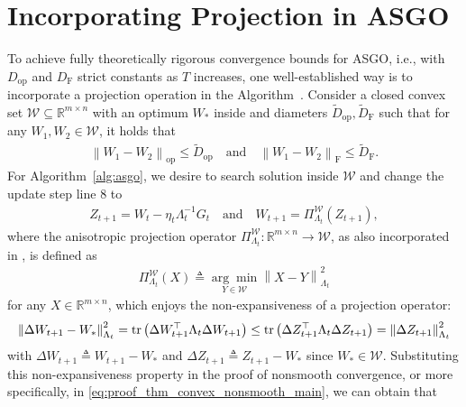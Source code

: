 \documentclass{article}
\theoremstyle{remark}
\newcommand{\Norm}[1]{\left\|#1\right\|}
\newcommand{\tr}[1]{{\rm tr}\left( #1 \right)}
\newcommand{\cW}{\mathcal{W}}
\newcommand{\RR}{\mathbb{R}}
\begin{document}
\section{Incorporating Projection in ASGO}\label{appendix:projection_operation}
To achieve fully theoretically rigorous convergence bounds for ASGO, i.e., with $D_{\mathrm{op}}$ and $D_{\mathrm{F}}$ strict constants as $T$ increases, one well-established way is to incorporate a projection operation in the Algorithm~\citep{hazan2007logarithmic,duchi2011adaptive}. Consider a closed convex set $\cW \subseteq \RR^{m\times n}$ with an optimum $W_*$ inside and diameters $\tilde{D}_{\mathrm{op}}, \tilde{D}_{\mathrm{F}}$ such that for any $W_1, W_2 \in \cW$, it holds that
\begin{align*}
    \Norm{W_1 - W_2}_{\mathrm{op}} \le \tilde{D}_{\mathrm{op}} \quad \text{and} \quad \Norm{W_1 - W_2}_{\mathrm{F}} \le \tilde{D}_{\mathrm{F}} .
\end{align*}
For Algorithm~\ref{alg:asgo}, we desire to search solution inside $\cW$ and change the update step line 8 to
\begin{align*}
    Z_{t+1} = W_t - \eta_t \Lambda_t^{-1} G_t \quad \text{and} \quad 
    W_{t+1} = \Pi_{\Lambda_t}^{\cW}\left( Z_{t+1} \right) ,
\end{align*}
where the anisotropic projection operator $\Pi_{\Lambda_t}^{\cW}: \RR^{m\times n} \to \cW$, as also incorporated in \citet{hazan2007logarithmic,duchi2011adaptive}, is defined as
\begin{align*}
    \Pi_{\Lambda_t}^{\cW}\left( X \right) \triangleq \underset{Y \in \cW}{\arg \min} \Norm{X - Y}_{\Lambda_t}^2
\end{align*}
for any $X \in \RR^{m\times n}$, which enjoys the non-expansiveness of a projection operator:
\begin{align}\label{eq:non-expansiveness-projection}
    \Norm{\Delta W_{t+1} - W_*}_{\Lambda_t}^2 = \tr{\Delta W_{t+1}^\top \Lambda_t \Delta W_{t+1}} \le \tr{\Delta Z_{t+1}^\top \Lambda_t \Delta Z_{t+1}} = \Norm{\Delta Z_{t+1}}_{\Lambda_t}^2
\end{align}
with $\Delta W_{t+1} \triangleq W_{t+1} - W_*$ and $\Delta Z_{t+1} \triangleq Z_{t+1} - W_*$
since $W_* \in \cW$. Substituting this non-expansiveness property in the proof of nonsmooth convergence, or more specifically, in \eqref{eq:proof_thm_convex_nonsmooth_main}, we can obtain that
\end{document}
